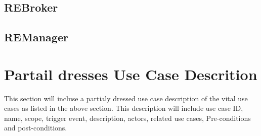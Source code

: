 \documentclass[11pt]{article}
\begin{document}
		\subsection{REBroker}
		
		\subsection{REManager}
	
	\section{Partail dresses Use Case Descrition}
	\begin{flushleft}
		This section will incluse a partialy dressed use case description of the vital use cases as listed in the above section. This description will include use case ID, name, scope, trigger event, description, actors, related use cases, Pre-conditions and post-conditions.
	\end{flushleft}
\end{document}
